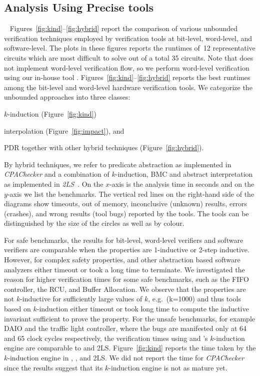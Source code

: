 \subsection{Analysis Using Precise tools}~\label{precise}
%
Figures~\ref{fig:kind}--\ref{fig:hybrid} report the comparison of various unbounded 
verification techniques employed by verification tools at bit-level, word-level, 
and software-level.  The plots in these figures reports the runtimes of~12 
representative circuits which are most difficult to solve out of a total 35 
circuits.  Note that \ABC does not implement word-level verification flow, 
so we perform word-level verification using our in-house tool \ebmc.
Figures~\ref{fig:kind}--\ref{fig:hybrid} reports the best runtimes 
among the bit-level and word-level hardware verification tools.  
%
We categorize the unbounded approaches into three classes:
\begin{compactitem}
\item $k$-induction (Figure~\ref{fig:kind})
\item interpolation (Figure~\ref{fig:impact}), and 
\item PDR together with other hybrid techniques (Figure~\ref{fig:hybrid}).  
\end{compactitem}
By hybrid techniques, we refer to predicate
abstraction as implemented in \emph{CPAChecker} and a combination of
$k$-induction, BMC and abstract interpretation as implemented in
\emph{2LS}~\cite{kiki}.  On the $x$-axis is the analysis time in
seconds and on the $y$-axis we list the benchmarks. The vertical red lines on
the right-hand side of the diagrams show timeouts, out of memory,
inconclusive (unknown) results, errors (crashes), and wrong results
(tool bugs) reported by the tools. The tools can be distinguished 
by the size of the circles as well as by colour. 

 For safe benchmarks, the results
for bit-level, word-level verifiers and software verifiers are
comparable when the properties are 1-inductive or 2-step inductive.
However, for complex safety properties, \ABC and other abstraction
based software analyzers either timeout or took a long time to
terminate.  We investigated the reason for higher verification times
for some safe benchmarks, such as the FIFO controller, the RCU, and Buffer 
Allocation.  We observe that the properties are not $k$-inductive for
sufficiently large values of $k$, e.g.\ (k=1000) and thus tools based
on $k$-induction either timeout or took long time to
compute the inductive invariant sufficient to prove the property. For
the unsafe benchmarks, for example DAIO and the traffic light controller, where
the bugs are manifested only at 64 and 65 clock cycles respectively,
the verification times using \ABC and \ebmc's $k$-induction engine 
are comparable to \cbmcv and \textsc{2LS}. Figure~\ref{fig:kind} 
reports the time taken by the $k$-induction engine in 
\ABC, \ebmcv, \cbmcv and \textsc{2LS}.  We did not report
the time for \emph{CPAChecker} since the results suggest that 
its $k$-induction engine is not as mature yet. 

